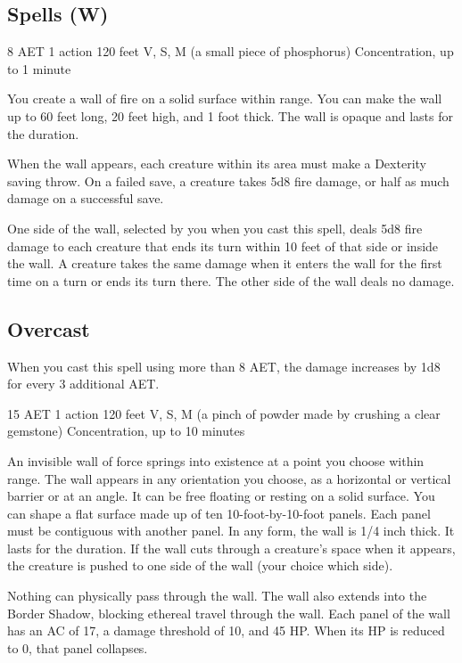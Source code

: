 \subsection{Spells (W)}
\label{spell:wall-of-fire}
{8 AET}
{1 action}
{120 feet}
{V, S, M (a small piece of phosphorus)}
{Concentration, up to 1 minute}

You create a wall of fire on a solid surface within range. You can make the wall up to 60 feet long, 20 feet high, and 1 foot thick. The wall is opaque and lasts for the duration.

When the wall appears, each creature within its area must make a Dexterity saving throw. On a failed save, a creature takes 5d8 fire damage, or half as much damage on a successful save.

One side of the wall, selected by you when you cast this spell, deals 5d8 fire damage to each creature that ends its turn within 10 feet of that side or inside the wall. A creature takes the same damage when it enters the wall for the first time on a turn or ends its turn there. The other side of the wall deals no damage.

\subsection*{Overcast} When you cast this spell using more than 8 AET, the damage increases by 1d8 for every 3 additional AET.

\label{spell:wall-of-force}
{15 AET}
{1 action}
{120 feet}
{V, S, M (a pinch of powder made by crushing a clear gemstone)}
{Concentration, up to 10 minutes}

An invisible wall of force springs into existence at a point you choose within range. The wall appears in any orientation you choose, as a horizontal or vertical barrier or at an angle. It can be free floating or resting on a solid surface. You can shape a flat surface made up of ten 10-foot-by-10-foot panels. Each panel must be contiguous with another panel. In any form, the wall is 1/4 inch thick. It lasts for the duration. If the wall cuts through a creature's space when it appears, the creature is pushed to one side of the wall (your choice which side).

Nothing can physically pass through the wall. The wall also extends into the Border Shadow, blocking ethereal travel through the wall. Each panel of the wall has an AC of 17, a damage threshold of 10, and 45 HP. When its HP is reduced to 0, that panel collapses.

